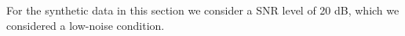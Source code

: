 For the synthetic data in this section we consider a SNR level of 20 dB, which we considered a low-noise condition.



%
%
%
%
%

